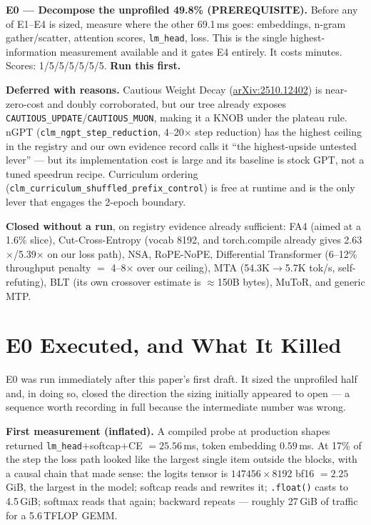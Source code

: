 \documentclass{article}
\begin{document}
\textbf{E0 --- Decompose the unprofiled 49.8\% (PREREQUISITE).} Before any of E1--E4 is sized, measure where the other 69.1\,ms goes: embeddings, n-gram gather/scatter, attention scores, \texttt{lm\_head}, loss. This is the single highest-information measurement available and it gates E4 entirely. It costs minutes. Scores: 1/5/5/5/5/5/5. \textbf{Run this first.}

\textbf{Deferred with reasons.} Cautious Weight Decay (\href{https://arxiv.org/abs/2510.12402}{arXiv:2510.12402}) is near-zero-cost and doubly corroborated, but our tree already exposes \texttt{CAUTIOUS\_UPDATE}/\texttt{CAUTIOUS\_MUON}, making it a KNOB under the plateau rule. nGPT (\texttt{clm\_ngpt\_step\_reduction}, 4--20$\times$ step reduction) has the highest ceiling in the registry and our own evidence record calls it ``the highest-upside untested lever'' --- but its implementation cost is large and its baseline is stock GPT, not a tuned speedrun recipe. Curriculum ordering (\texttt{clm\_curriculum\_shuffled\_prefix\_control}) is free at runtime and is the only lever that engages the 2-epoch boundary.

\textbf{Closed without a run}, on registry evidence already sufficient: FA4 (aimed at a 1.6\% slice), Cut-Cross-Entropy (vocab 8192, and torch.compile already gives 2.63$\times$/5.39$\times$ on our loss path), NSA, RoPE-NoPE, Differential Transformer (6--12\% throughput penalty $=$ 4--8$\times$ over our ceiling), MTA (54.3K$\to$5.7K tok/s, self-refuting), BLT (its own crossover estimate is $\approx$150B bytes), MuToR, and generic MTP.

\section{E0 Executed, and What It Killed}
\label{sec:e0done}
E0 was run immediately after this paper's first draft. It sized the unprofiled half and, in doing so, closed the direction the sizing initially appeared to open --- a sequence worth recording in full because the intermediate number was wrong.

\textbf{First measurement (inflated).} A compiled probe at production shapes returned \texttt{lm\_head}$+$softcap$+$CE $= 25.56$\,ms, token embedding $0.59$\,ms. At 17\% of the step the loss path looked like the largest single item outside the blocks, with a causal chain that made sense: the logits tensor is $147456\times8192$ bf16 $=2.25$\,GiB, the largest in the model; softcap reads and rewrites it; \texttt{.float()} casts to 4.5\,GiB; softmax reads that again; backward repeats --- roughly 27\,GiB of traffic for a 5.6\,TFLOP GEMM.
\end{document}
